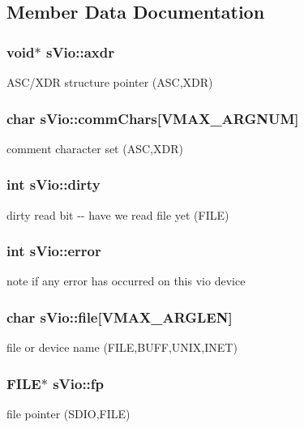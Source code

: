 \subsection{Member Data Documentation}
\subsubsection[{axdr}]{\setlength{\rightskip}{0pt plus 5cm}void$\ast$ {\bf sVio::axdr}}\label{a00002_acdd32890033cf340b8749afe256647f9}
ASC/XDR structure pointer (ASC,XDR) 
\subsubsection[{commChars}]{\setlength{\rightskip}{0pt plus 5cm}char {\bf sVio::commChars}[VMAX\_\-ARGNUM]}\label{a00002_a58c30e0df43f9853024a3d617f62ee33}
comment character set (ASC,XDR) 
\subsubsection[{dirty}]{\setlength{\rightskip}{0pt plus 5cm}int {\bf sVio::dirty}}\label{a00002_a72fb31f8402b0529548f19d2fef80dc6}
dirty read bit -\/-\/ have we read file yet (FILE) 
\subsubsection[{error}]{\setlength{\rightskip}{0pt plus 5cm}int {\bf sVio::error}}\label{a00002_af77cb7bb4dafab6b485a881732e7b8f9}
note if any error has occurred on this vio device 
\subsubsection[{file}]{\setlength{\rightskip}{0pt plus 5cm}char {\bf sVio::file}[VMAX\_\-ARGLEN]}\label{a00002_ab8b3817815f2c248fb0e781944a43b17}
file or device name (FILE,BUFF,UNIX,INET) 
\subsubsection[{fp}]{\setlength{\rightskip}{0pt plus 5cm}FILE$\ast$ {\bf sVio::fp}}\label{a00002_a6ac2f825edaf90c684faebbb17ad67d4}
file pointer (SDIO,FILE) 
